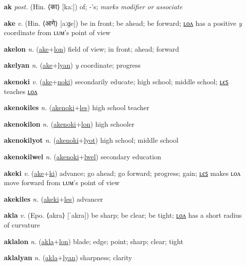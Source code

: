 \textbf{\hypertarget{ak}{ak}} \textit{post.} (Hin. ⟨{\devanagari{}का}⟩ [kaː])
of; -’s; \textit{marks modifier or associate}

\textbf{\hypertarget{ake}{ake}} \textit{v.} (Hin. ⟨{\devanagari{}आगे}⟩ [aːɡe])
be in front; be ahead; be forward; \hyperlink{akelon}{ʟᴏᴧ} has a positive \textit{y} coordinate from ʟᴜᴍ’s point of view

\textbf{\hypertarget{akelon}{akelon}} \textit{n.} (\hyperlink{ake}{ake}+\allowbreak \hyperlink{lon}{lon})
field of view; in front; ahead; forward

\textbf{\hypertarget{akelyan}{akelyan}} \textit{n.} (\hyperlink{ake}{ake}+\allowbreak \hyperlink{lyan}{lyan})
\textit{y} coordinate; progress

\textbf{\hypertarget{akenoki}{akenoki}} \textit{v.} (\hyperlink{ake}{ake}+\allowbreak \hyperlink{noki}{noki})
secondarily educate; high school; middle school; \hyperlink{akenokiles}{ʟєꜱ} teaches \hyperlink{akenokilon}{ʟᴏᴧ}

\textbf{\hypertarget{akenokiles}{akenokiles}} \textit{n.} (\hyperlink{akenoki}{akenoki}+\allowbreak \hyperlink{les}{les})
high school teacher

\textbf{\hypertarget{akenokilon}{akenokilon}} \textit{n.} (\hyperlink{akenoki}{akenoki}+\allowbreak \hyperlink{lon}{lon})
high schooler

\textbf{\hypertarget{akenokilyot}{akenokilyot}} \textit{n.} (\hyperlink{akenoki}{akenoki}+\allowbreak \hyperlink{lyot}{lyot})
high school; middle school

\textbf{\hypertarget{akenokilwel}{akenokilwel}} \textit{n.} (\hyperlink{akenoki}{akenoki}+\allowbreak \hyperlink{lwel}{lwel})
secondary education

\textbf{\hypertarget{akeki}{akeki}} \textit{v.} (\hyperlink{ake}{ake}+\allowbreak \hyperlink{ki}{ki})
advance; go ahead; go forward; progress; gain; \hyperlink{akekiles}{ʟєꜱ} makes ʟᴏᴧ move forward from ʟᴜᴍ’s point of view

\textbf{\hypertarget{akekiles}{akekiles}} \textit{n.} (\hyperlink{akeki}{akeki}+\allowbreak \hyperlink{les}{les})
advancer

\textbf{\hypertarget{akla}{akla}} \textit{v.} (Epo. ⟨akra⟩ [ˈakra])
be sharp; be clear; be tight; \hyperlink{aklalon}{ʟᴏᴧ} has a short radius of curvature

\textbf{\hypertarget{aklalon}{aklalon}} \textit{n.} (\hyperlink{akla}{akla}+\allowbreak \hyperlink{lon}{lon})
blade; edge; point; sharp; clear; tight

\textbf{\hypertarget{aklalyan}{aklalyan}} \textit{n.} (\hyperlink{akla}{akla}+\allowbreak \hyperlink{lyan}{lyan})
sharpness; clarity

